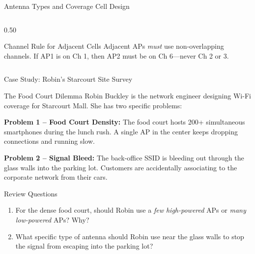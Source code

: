 \documentclass[aspectratio=169]{beamer}
\begin{document}
\begin{frame}{Antenna Types and Coverage Cell Design}
\begin{columns}[T]
\begin{column}{0.50\textwidth}
\begin{center}
            \end{center}
            \vspace{0.2em}
            \begin{alertblock}{Channel Rule for Adjacent Cells}
                \footnotesize
                Adjacent APs \emph{must} use non-overlapping channels. If AP1 is on Ch 1, then AP2 must be on Ch 6---never Ch 2 or 3.
            \end{alertblock}
        \end{column}
    \end{columns}
\end{frame}

\begin{frame}{Case Study: Robin's Starcourt Site Survey}
    \begin{casestudy}{The Food Court Dilemma}
        \footnotesize
        Robin Buckley is the network engineer designing Wi-Fi coverage for Starcourt Mall. She has two specific problems:

        \vspace{0.3em}
        \textbf{Problem 1 -- Food Court Density:} The food court hosts 200+ simultaneous smartphones during the lunch rush. A single AP in the center keeps dropping connections and running slow.

        \vspace{0.3em}
        \textbf{Problem 2 -- Signal Bleed:} The back-office SSID is bleeding out through the glass walls into the parking lot. Customers are accidentally associating to the corporate network from their cars.
    \end{casestudy}

    \begin{block}{Review Questions}
        \footnotesize
        \begin{enumerate}
            \item For the dense food court, should Robin use a \emph{few high-powered} APs or \emph{many low-powered} APs? Why?
            \item What specific type of antenna should Robin use near the glass walls to stop the signal from escaping into the parking lot?
        \end{enumerate}
    \end{block}
\end{frame}
\end{document}
